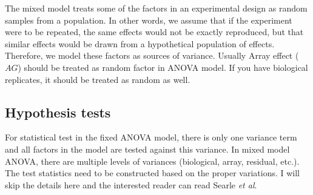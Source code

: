 The mixed model treats some of the factors in an experimental 
design as random samples from a population.   
In other words, we assume that if the experiment were 
to be repeated, the same effects would not be exactly 
reproduced, but that similar effects would be drawn 
from a hypothetical population of effects.  Therefore, 
we model these factors as sources of variance. 
Usually Array effect ($AG$) should be treated as random
factor in ANOVA model. If you have biological replicates,
it should be treated as random as well. 


\subsection{Hypothesis tests}
For statistical test in the fixed ANOVA model, 
there is only one variance term 
and all factors in the model are tested against this variance.
In mixed model ANOVA, there are multiple levels 
of variances (biological, array, residual, etc.). 
The test statistics need to be constructed based on 
the proper variations. I will skip the details here and 
the interested reader can read Searle {\it et al}. 


